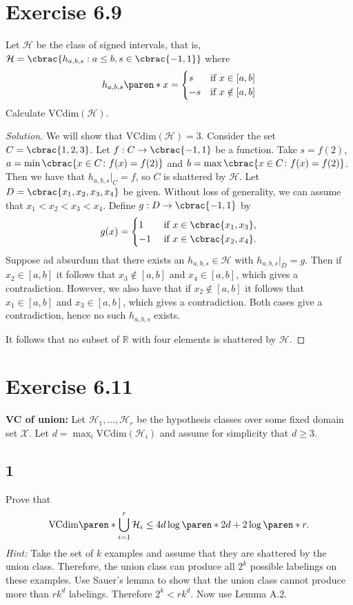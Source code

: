 \documentclass[10pt, a4paper, twoside]{amsart}
\theoremstyle{plain}
\newcommand{\R}{\ensuremath{\mathbb{R}}}
\DeclarePairedDelimiter\cbrac\{\}
\DeclarePairedDelimiter\paren()
\renewcommand{\c}{\ensuremath{\colon}}
\newcommand{\cH}{\ensuremath{\mathcal{H}}}
\newcommand{\cX}{\ensuremath{\mathcal{X}}}
\newenvironment{solution}
               {\let\oldqedsymbol=\qedsymbol
                \renewcommand{\qedsymbol}{$\blacktriangleleft$}
                \begin{proof}[Solution]}
               {\end{proof}
                \renewcommand{\qedsymbol}{\oldqedsymbol}}
\begin{document}
\section*{Exercise 6.9}
Let $\cH$ be the class of signed intervals, that is, \\
$\cH = \cbrac{h_{a,b,s}:a \leq b, s \in \cbrac{-1,1}}$ where
\begin{equation*}
  h_{a,b,s}\paren*{x} =
  \begin{cases} 
    s &\mbox{if } x \in [a,b] \\
    -s &\mbox{if } x \notin [a,b]
  \end{cases}
\end{equation*}
Calculate $\text{VCdim}(\cH)$.
 \begin{solution}
  We will show that $\mathrm{VCdim}(\cH)=3$. Consider the set $C=\cbrac{1,2,3}$. Let $f:C \to \cbrac{-1,1}$ be a function.
  Take $s = f(2)$, $a=\min\cbrac{x \in C \c f(x)=f(2)}$ and $b=\max\cbrac{x \in C \c f(x)=f(2)}$. Then we have that $h_{a,b,s}|_{C}=f$,
  so $C$ is shattered by $\cH$. Let $D=\cbrac{x_1,x_2,x_3,x_4}$ be given. Without loss of generality, we can assume that $x_1<x_2<x_3<x_4$. Define $g:D\to\cbrac{-1,1}$ by
  \begin{equation*}
   g(x)=
   \begin{cases}
    1 & \text{ if }x\in \cbrac{x_1,x_3}, \\
    -1 & \text{ if }x\in \cbrac{x_2,x_4}.
   \end{cases}
  \end{equation*}
Suppose ad absurdum that there exists an $h_{a,b,s} \in \cH$ with $h_{a,b,s}|_{D}=g$. Then if $x_2 \in [a,b]$ it follows that $x_3  \notin [a,b]$ and $x_4 \in [a,b]$, which gives a contradiction. However, we also have that if $x_2 \notin [a,b]$
it follows that $x_1  \in [a,b]$ and $x_3 \in [a,b]$, which gives a contradiction. 
Both cases give a contradiction, hence no such $h_{a,b,s}$ exists.

It follows that no subset of $\R$ with four elements is shattered by $\cH$.  
 \end{solution}
\section*{Exercise 6.11}
\textbf{VC of union:} Let $\cH_1, \ldots , \cH_r$ be the hypothesis classes over some fixed domain set $\cX$. Let $d = \max_i \text{VCdim}(\cH_i)$ and assume for simplicity that $d \geq 3$.
\subsection*{1}
Prove that
\begin{equation*}
  \text{VCdim}\paren*{\bigcup_{i=1}^r\cH_i}\leq 4d \log \paren*{2d} + 2 \log \paren*{r}.
\end{equation*}
\textit{Hint:} Take the set of $k$ examples and assume that they are shattered by the union class. Therefore, the union class can produce all $2^k$ possible labelings on these examples. Use Sauer's lemma to show that the union class cannot produce more than $rk^d$  labelings. Therefore $2^k < rk^d$. Now use Lemma A.2.
\end{document}
